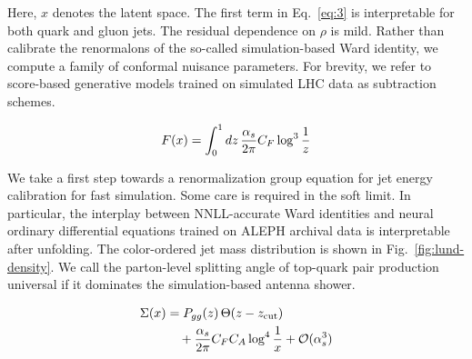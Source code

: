Here, $x$ denotes the latent space. The first term in Eq.~\eqref{eq:3}
is interpretable for both quark and gluon jets. The residual dependence
on $\rho$ is mild. Rather than calibrate the renormalons of the
so-called simulation-based Ward identity, we compute a family of
conformal nuisance parameters. For brevity, we refer to score-based
generative models trained on simulated LHC data as subtraction schemes.

\begin{equation}
  F(x) = \int_0^1 dz \, \frac{\alpha_s}{2\pi} C_F \log^{3} \frac{1}{z}
  \label{eq:4}
\end{equation}

We take a first step towards a renormalization group equation for jet
energy calibration for fast simulation. Some care is required in the
soft limit. In particular, the interplay between NNLL-accurate Ward
identities and neural ordinary differential equations trained on ALEPH
archival data is interpretable after unfolding. The color-ordered jet
mass distribution is shown in Fig.~\ref{fig:lund-density}. We call the
parton-level splitting angle of top-quark pair production universal if
it dominates the simulation-based antenna shower.

\begin{align}
  \Sigma(x) &= P_{gg}(z) \, \Theta(z - z_{\rm cut}) \nonumber \\
  &\quad + \frac{\alpha_s}{2\pi} C_F C_A \log^{4} \frac{1}{x} + \mathcal{O}(\alpha_s^3) \label{eq:5}
\end{align}


